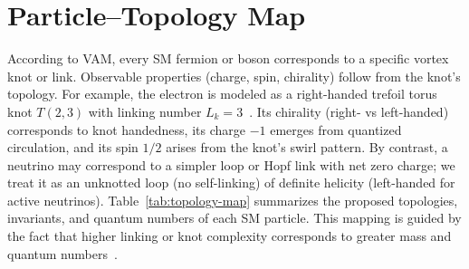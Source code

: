 \documentclass[a4paper,12pt]{article}
\begin{document}
\section*{Particle--Topology Map}
According to VAM, every SM fermion or boson corresponds to a specific vortex knot or link. Observable properties (charge, spin, chirality) follow from the knot's topology. For example, the electron is modeled as a right-handed trefoil torus knot $T(2,3)$ with linking number $L_k=3$~\cite{vam-lagrangian}. Its chirality (right- vs left-handed) corresponds to knot handedness, its charge $-1$ emerges from quantized circulation, and its spin $1/2$ arises from the knot's swirl pattern. By contrast, a neutrino may correspond to a simpler loop or Hopf link with net zero charge; we treat it as an unknotted loop (no self-linking) of definite helicity (left-handed for active neutrinos). Table~\ref{tab:topology-map} summarizes the proposed topologies, invariants, and quantum numbers of each SM particle. This mapping is guided by the fact that higher linking or knot complexity corresponds to greater mass and quantum numbers~\cite{vam-lagrangian}.
\end{document}
